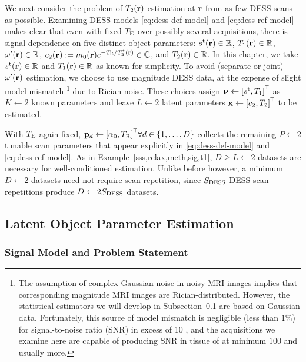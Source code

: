 We next consider 
the problem of $\Tt\pr$ estimation at $\mathbf{r}$
from as few DESS scans as possible.
Examining DESS models 
\eqref{eq:dess-def-model} and \eqref{eq:dess-ref-model}
makes clear that even with fixed $T_\mathrm{E}$
over possibly several acquisitions, 
there is signal dependence 
on five distinct object parameters:
$\stx\pr \in \real$,
$\To\pr \in \real$, 
$\ompmed\pr \in \real$,
$\const{2}\pr := \mzero\pr e^{-\TE/\Tts\pr} \in \complex$, 
and $\Tt\pr \in \real$.
In this chapter,
we take $\stx\pr \in \real$ and $\To\pr \in \real$
as known for simplicity.
To avoid (separate or joint) $\ompmed\pr$ estimation,
we choose to use magnitude DESS data,
at the expense of slight model mismatch
\footnote{The assumption of complex Gaussian noise 
in noisy MRI images
implies that corresponding magnitude MRI images
are Rician-distributed.
However,
the statistical estimators
we will develop
in Subsection~\ref{ss,relax,meth,est}
are based on Gaussian data.
Fortunately,
this source of model mismatch
is negligible (less than $1\%$)
for signal-to-noise ratio (SNR)
in excess of 10 \cite{gudbjartsson:95:trd},
and the acquisitions we examine here
are capable of producing SNR in tissue 
of at minimum $100$ and usually more. 
}
due to Rician noise.
These choices assign 
$\bmnu \gets \brac{\stx, \To}\tpose$ 
as $K \gets 2$
known parameters
and leave $L \gets 2$
latent parameters  
$\bmx \gets \brac{\const{2}, \Tt}\tpose$
to be estimated.

With $T_\mathrm{E}$ again fixed, 
$\bmp_d \gets \brac{\flipnom, \TR}\tpose
\forall d \in \set{1,\dots,D}$
collects the remaining $P \gets 2$ 
tunable scan parameters
that appear explicitly in
\eqref{eq:dess-def-model} and \eqref{eq:dess-ref-model}.
As in Example~\ref{sss,relax,meth,sig,t1},
$D \geq L \gets 2$ datasets are necessary
for well-conditioned estimation.
Unlike before however,
a minimum $D \gets 2$ datasets 
need not require scan repetition,
since $S_{\mathrm{DESS}}$ DESS scan repetitions
produce $D \gets 2S_{\mathrm{DESS}}$ datasets.

\subsection{Latent Object Parameter Estimation}
\label{ss,relax,meth,est}

\subsubsection{Signal Model and Problem Statement}
\label{sss,relax,meth,est,sig}

